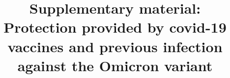 \documentclass[9pt,onecolumn,twoside,lineno]{pnas-new}
\begin{document}


\title{Supplementary material:\\
Protection provided by covid-19 vaccines and previous infection against the Omicron variant}


\author{}


\maketitle

\setcounter{table}{0}
\renewcommand{\thetable}{S\arabic{table}}
\setcounter{figure}{0}
\renewcommand{\thefigure}{S\arabic{figure}}

\end{document}
